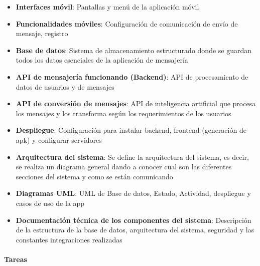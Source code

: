 \documentclass[lettersize,journal]{IEEEtran}
\begin{document}
\begin{itemize}
	\item \textbf{Interfaces móvil}: Pantallas y menú de la aplicación móvil
	\item \textbf{Funcionalidades móviles}: Configuración de comunicación de envío de mensaje, registro
	\item \textbf{Base de datos}: Sistema de almacenamiento estructurado donde se guardan todos los datos esenciales de la aplicación de mensajería
	\item \textbf{API de mensajería funcionando (Backend)}: API de procesamiento de datos de usuarios y de mensajes
	\item \textbf{API de conversión de mensajes}: API de inteligencia artificial que procesa los mensajes y los transforma según los requerimientos de los usuarios
	\item \textbf{Despliegue}: Configuración para instalar backend, frontend (generación de apk) y configurar servidores
	\item \textbf{Arquitectura del sistema}: Se define la arquitectura del sistema, es decir, se realiza un diagrama general dando a conocer cual son las diferentes secciones del sistema y como se están comunicando
	\item \textbf{Diagramas UML}: UML de Base de datos, Estado, Actividad, despliegue y casos de uso de la app
	\item \textbf{Documentación técnica de los componentes del sistema}: Descripción de la estructura de la base de datos, arquitectura del sistema, seguridad y las constantes integraciones realizadas
\end{itemize}

\paragraph{Tareas}
\end{document}

